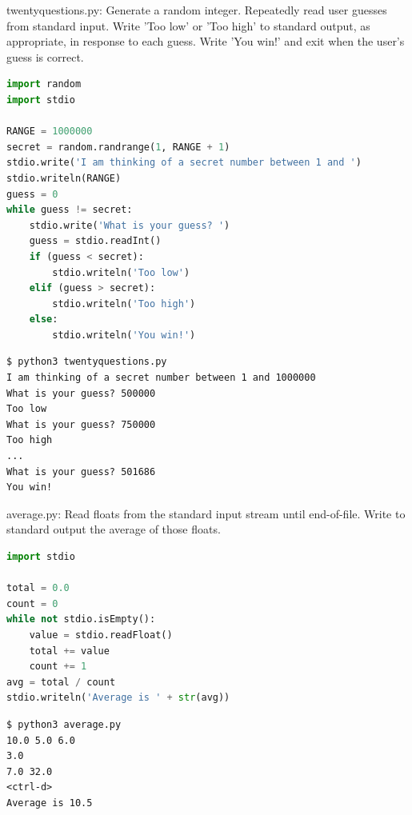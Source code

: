 \documentclass[8pt,a4paper,compress]{beamer}
\begin{document}
\begin{frame}[fragile]
\pause

\begin{framed}
\tiny twentyquestions.py: Generate a random integer. Repeatedly read user guesses from standard input. Write 'Too low' or 'Too high' to standard output, as appropriate, in response to each guess. Write 'You win!' and exit when the user's guess is correct.
\end{framed}

\begin{lstlisting}[language=Python,style=focusin]
import random
import stdio

RANGE = 1000000
secret = random.randrange(1, RANGE + 1)
stdio.write('I am thinking of a secret number between 1 and ')
stdio.writeln(RANGE)
guess = 0
while guess != secret:
    stdio.write('What is your guess? ')
    guess = stdio.readInt()
    if (guess < secret):
        stdio.writeln('Too low')
    elif (guess > secret):
        stdio.writeln('Too high')
    else:
        stdio.writeln('You win!')
\end{lstlisting}

\pause\bigskip

\begin{lstlisting}[language={},style=focusin]
$ python3 twentyquestions.py
I am thinking of a secret number between 1 and 1000000
What is your guess? 500000
Too low
What is your guess? 750000     
Too high
...
What is your guess? 501686
You win!
\end{lstlisting}
\end{frame}

\begin{frame}[fragile]
\pause

\begin{framed}
\tiny average.py: Read floats from the standard input stream until end-of-file. Write to standard output the average of those floats.
\end{framed}

\begin{lstlisting}[language=Python,style=focusin]
import stdio

total = 0.0
count = 0
while not stdio.isEmpty():
    value = stdio.readFloat()
    total += value
    count += 1
avg = total / count
stdio.writeln('Average is ' + str(avg))
\end{lstlisting}

\pause\bigskip

\begin{lstlisting}[language={},style=focusin]
$ python3 average.py
10.0 5.0 6.0
3.0
7.0 32.0
<ctrl-d>
Average is 10.5
\end{lstlisting}
\end{frame}
\end{document}
